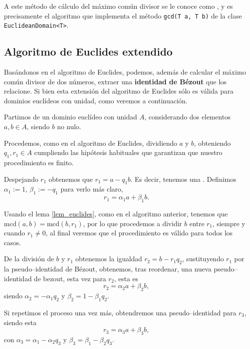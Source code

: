 \documentclass[a4paper, 11pt, twoside, notitlepage, openany, onecolumn, final]{report}
\begin{document}
	A este método de cálculo del máximo común divisor se le conoce como , y es precisamente el algoritmo que implementa el método \texttt{gcd(T a, T b)} de la clase \texttt{EuclideanDomain<T>}.
	\subsection{Algoritmo de Euclides extendido}
	Basándonos en el algoritmo de Euclides, podemos, además de calcular el máximo común divisor de dos números, extraer una \textbf{identidad de Bézout} que los relacione. Si bien esta extensión del algoritmo de Euclides sólo es válida para dominios euclídeos con unidad, como veremos a continuación.
	
	Partimos de un dominio euclídeo con unidad $A$, considerando dos elementos $a,b\in A$, siendo $b$ no nulo.
	
	Procedemos, como en el algoritmo de Euclides, dividiendo $a$ y $b$, obteniendo $q_1,r_1\in A$ cumpliendo las hipótesis habituales que garantizan que nuestro procedimiento es finito.
	
	Despejando $r_1$ obtenemos que $r_1=a-q_1b$. Es decir, tenemos una . Definimos $\alpha_1:=1$, $\beta_1:=-q_1$ para verlo más claro, \begin{equation*}
		r_1 = \alpha_1a +\beta_1b.
	\end{equation*}
	
	Usando el lema \eqref{lem_euclides}, como en el algoritmo anterior, tenemos que $\text{mcd}(a,b)=\text{mcd}(b,r_1)$, por lo que procedemos a dividir $b$ entre $r_1$, siempre y cuando $r_1\not=0$, al final veremos que el procedimiento es válido para todos los casos.
	
	De la división de  $b$ y $r_1$ obtenemos la igualdad $r_2=b-r_1q_2$, sustituyendo $r_1$ por la pseudo--identidad de Bézout, obtenemos, tras reordenar, una nueva pseudo--identidad de bezout, esta vez para $r_2$, esta es
	\begin{equation*}
		r_2=\alpha_2a+\beta_2b,
	\end{equation*}
	siendo $\alpha_2=-\alpha_1q_2$ y $\beta_2=1-\beta_1q_2$.
	
	Si repetimos el proceso una vez más, obtendremos una pseudo--identidad para $r_3$, siendo esta
	\begin{equation*}
		r_3=\alpha_3a+\beta_3b,
	\end{equation*}
	con $\alpha_3=\alpha_1-\alpha_2q_3$ y $\beta_3=\beta_1-\beta_2q_3$.
	
\end{document}
